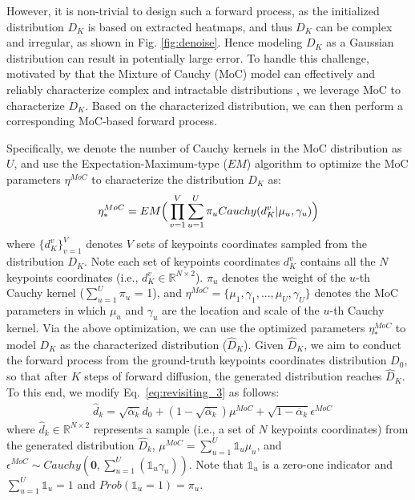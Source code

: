 \documentclass[10pt,twocolumn,letterpaper]{article}
\begin{document}
However, it is non-trivial to design such a forward process, as the initialized distribution $D_K$ is based on extracted heatmaps, 
and thus $D_K$ can be complex and irregular, as shown in Fig. \ref{fig:denoise}.
Hence modeling $D_K$ as a Gaussian distribution can result in potentially large error.
To handle this challenge, motivated by that the Mixture of Cauchy (MoC) model can effectively and reliably characterize complex and intractable distributions \cite{sym11091186},
we leverage MoC to characterize $D_K$.
Based on the characterized distribution, we can then perform a corresponding MoC-based forward process.

Specifically, we denote the number of Cauchy kernels in the MoC distribution as $U$, and use the Expectation-Maximum-type ($EM$) algorithm \cite{sym11091186,teimouri2018statistical} to optimize the MoC parameters $\eta^{MoC}$ to characterize the distribution $D_K$ as:
\begin{equation} \label{eq:training_1}
\setlength{\abovedisplayskip}{3pt}
\setlength{\belowdisplayskip}{3pt}
\begin{aligned}
\eta_{*}^{MoC} = EM \Big( \prod^V_{v=1} \sum^U_{u=1} \pi_u Cauchy(d^v_K|\mu_u, \gamma_u) \Big)
\end{aligned}
\end{equation}
where $\{d^v_K\}^{V}_{v=1}$ denotes $V$ sets of keypoints coordinates sampled from the distribution $D_K$.
Note each set of keypoints coordinates $d^v_K$ contains all the $N$ keypoints coordinates (i.e., $ d^v_K \in \mathbb{R}^{N\times2}$).
$\pi_u$ denotes the weight of the $u$-th Cauchy kernel ($\sum^U_{u=1} \pi_u$ = 1), and $\eta^{MoC} = \{\mu_1, \gamma_1, ..., \mu_U, \gamma_U\}$ denotes the MoC parameters in which $\mu_u$ and $\gamma_u$ are the location and scale of the $u$-th Cauchy kernel. 
Via the above optimization, we can use the optimized parameters $\eta_{*}^{MoC}$ to model $D_K$ as the characterized distribution ($\hat{D}_K$). 
Given $\hat{D}_K$, we aim to conduct the forward process from the ground-truth keypoints coordinates distribution $D_0$, so that after $K$ steps of forward diffusion, the generated distribution reaches $\hat{D}_K$.
To this end, we modify Eq.~\ref{eq:revisiting_3} as follows:
\begin{equation} \label{eq:training_2}
\begin{aligned}
& \hat{d}_k = \sqrt{\overline{\alpha}_k}d_0 + (1 - \sqrt{\overline{\alpha}_k}) \mu^{MoC} +
\sqrt{1 - \overline{\alpha}_k}\epsilon^{MoC}
\end{aligned}
\end{equation}
where $\hat{d}_k\in\mathbb{R}^{N\times2}$ represents a sample (i.e., a set of $N$ keypoints coordinates) from the generated distribution $\hat{D}_k$, 
$\mu^{MoC}=\sum^U_{u=1} \mathds{1}_u \mu_u$, and $\epsilon^{MoC} \sim Cauchy(\textbf{0}, \sum^U_{u=1} (\mathds{1}_u \gamma_u))$. Note that $\mathds{1}_u$ is a 
zero-one indicator and $\sum^U_{u=1} \mathds{1}_u = 1$ and $Prob(\mathds{1}_u = 1) = \pi_u$.
\end{document}
